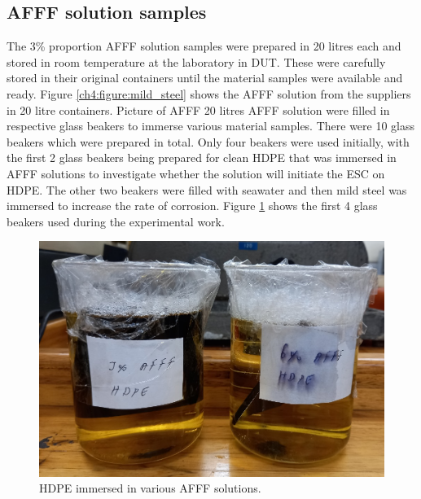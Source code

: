 \documentclass[12pt]{report}
\begin{document}
\subsection{AFFF solution samples}
The 3\% proportion AFFF solution samples were prepared in 20 litres each and stored in room temperature at the laboratory in DUT. These were carefully stored in their original containers until the material samples were available and ready. Figure \ref{ch4:figure:mild_steel} shows the AFFF solution from the suppliers in 20 litre containers.
Picture of AFFF 20 litres
AFFF solution were filled in respective glass beakers to immerse various material samples. There were 10 glass beakers which were prepared in total. Only four beakers were used initially, with the first 2 glass beakers being prepared for clean HDPE that was immersed in AFFF solutions to investigate whether the solution will initiate the ESC on HDPE. The other two beakers were filled with seawater and then mild steel was immersed to increase the rate of corrosion. Figure \ref{ch4:figure:hdpe_immersed} shows the first 4 glass beakers used during the experimental work.
 
\begin{figure}[H]
    \centering
    \includegraphics[width=.5\textwidth]{hdpe_immersed_in_various_afff_solutions.jpg}
    \caption{HDPE immersed in various AFFF solutions.}
    \label{ch4:figure:hdpe_immersed}
\end{figure}
 
\end{document}
